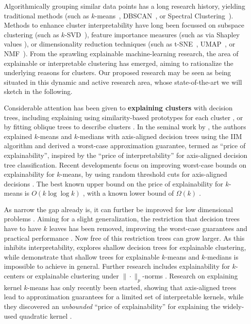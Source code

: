 \documentclass[a4paper,11pt]{article}
\begin{document}
Algorithmically grouping similar data points has a long research history,
yielding traditional methods (such as $k$-means~\cite{macqueen1967some}, DBSCAN~\cite{ester1996ada}, or Spectral Clustering~\cite{ng2001Ospectral}).
Methods to enhance cluster interpretability have long been focussed on subspace clustering (such as $k$-SVD~\cite{rubinstein2010dict}), feature importance measures (such as via Shapley values \cite{lundberg2017unified}), or dimensionality reduction techniques (such as t-SNE~\cite{hinton2002tsne}, UMAP~\cite{mcinnes2018umap}, or NMF~\cite{lee2000algorithms}).
From the sprawling explainable machine-learning research, the area of explainable or interpretable clustering has emerged, aiming to rationalize the underlying reasons for clusters. 
Our proposed research may be seen as being situated in this dynamic and active research area, whose state-of-the-art we will sketch in the following. 

Considerable attention has been given to \textbf{explaining clusters} with decision trees, including explaining using similarity-based prototypes for each cluster \cite{carrizosa2022interpreting}, or by fitting oblique trees to describe clusters \cite{gabidolla2022optimal}.
In the seminal work by \citet{moshkovitz2020explainable}, the authors explained $k$-means and $k$-medians with axis-aligned decision trees using the IIM algorithm and derived a worst-case approximation guarantee, termed as ``price of explainability'', inspired by the ``price of interpretability'' \cite{bertsimas2019price} for axis-aligned decision tree classification. 
Recent developments focus on improving worst-case bounds on explainability for $k$-means, by using random threshold cuts for axis-aligned decisions \cite{makarychev2022explainable, esfandiari2022almost, makarychev2023random}. 
The best known upper bound on the price of explainability for $k$-means is $O(k \log \log k)$ \cite{gupta2023price}, with a known lower bound of $\Omega(k)$ \cite{gamlath2021explainable}.

As narrow the gap already is, it can further be improved for low dimensional problems \cite{laber2021price, charikar2022near}. 
Aiming for a slight generalization, the restriction that decision trees have to have $k$ leaves has been removed, improving the worst-case guarantees \cite{makarychev2022explainable} and practical performance \cite{frost2020exkmc}. 
Now free of this restriction trees can grow larger.
As this inhibits interpretability, \citet{laber2023nearly} explores shallow decision trees for explainable clustering, while \citet{deng2023impossibility} demonstrate that shallow trees for explainable $k$-means and $k$-medians is impossible to achieve in general. 
Further research includes explainability for $k$-centers \cite{laber2021} or explainable clustering under $\|\cdot\|_p$-norms \cite{gamlath2021explainable}. 
Research on explaining kernel $k$-means has only recently been started, showing that axis-aligned trees lead to approximation guarantees for a limited set of interpretable kernels, while they discovered an \emph{unbounded} ``price of explainability'' for explaining the widely-used quadratic kernel \cite{fleissner2024explaining}.
\end{document}
